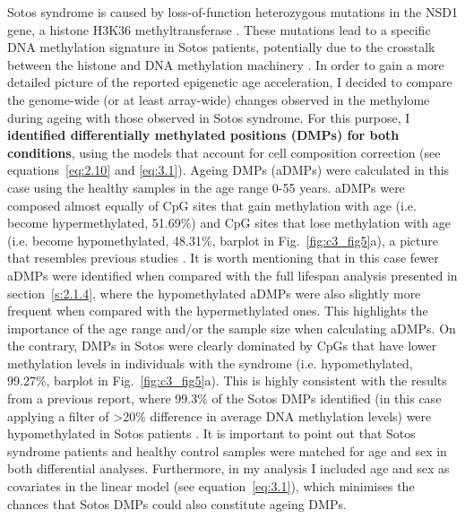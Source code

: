 Sotos syndrome is caused by loss-of-function heterozygous mutations in the NSD1 gene, a histone H3K36 methyltransferase \citep{Choufani2015, Kurotaki2002}. These mutations lead to a specific DNA methylation signature in Sotos patients, potentially due to the crosstalk between the histone and DNA methylation machinery \citep{Choufani2015}. In order to gain a more detailed picture of the reported epigenetic age acceleration, I decided to compare the genome-wide (or at least array-wide) changes observed in the methylome during ageing with those observed in Sotos syndrome. For this purpose, I \textbf{identified differentially methylated positions (DMPs) for both conditions}, using the models that account for cell composition correction (see equations~\ref{eq:2.10} and \ref{eq:3.1}). Ageing DMPs (aDMPs) were calculated in this case using the healthy samples in the age range 0-55 years. aDMPs were composed almost equally of CpG sites that gain methylation with age (i.e. become hypermethylated, 51.69\%) and CpG sites that lose methylation with age (i.e. become hypomethylated, 48.31\%, barplot in Fig.~\ref{fig:c3_fig5}a), a picture that resembles previous studies \citep{Zhu2018}. It is worth mentioning that in this case fewer aDMPs were identified when compared with the full lifespan analysis presented in section~\ref{s:2.1.4}, where the hypomethylated aDMPs were also slightly more frequent when compared with the hypermethylated ones. This highlights the importance of the age range and/or the sample size when calculating aDMPs. On the contrary, DMPs in Sotos were clearly dominated by CpGs that have lower methylation levels in individuals with the syndrome (i.e. hypomethylated, 99.27\%, barplot in Fig.~\ref{fig:c3_fig5}a). This is highly consistent with the results from a previous report, where 99.3\% of the Sotos DMPs identified (in this case applying a filter of >20\% difference in average DNA methylation levels) were hypomethylated in Sotos patients \citep{Choufani2015}. It is important to point out that Sotos syndrome patients and healthy control samples were matched for age and sex in both differential analyses. Furthermore, in my analysis I included age and sex as covariates in the linear model (see equation~\ref{eq:3.1}), which minimises the chances that Sotos DMPs could also constitute ageing DMPs.

